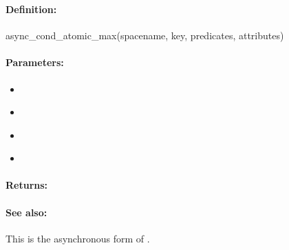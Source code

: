\pagebreak
\subsubsection{}
\label{api:ruby:async_cond_atomic_max}


\paragraph{Definition:}
\begin{rubycode}
async_cond_atomic_max(spacename, key, predicates, attributes)
\end{rubycode}

\paragraph{Parameters:}
\begin{itemize}[noitemsep]
\item {}\\

\item {}\\

\item {}\\

\item {}\\

\end{itemize}

\paragraph{Returns:}


\paragraph{See also:}  This is the asynchronous form of .

\pagebreak
\subsubsection{}
\label{api:ruby:group_atomic_max}


